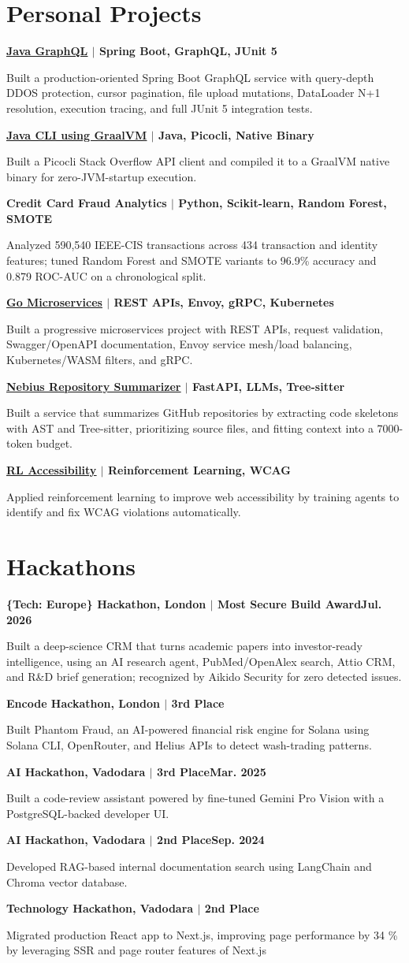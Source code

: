 \documentclass[a4paper,10pt]{article}
\newcommand{\projectLink}[2]{\href{#1}{\underline{#2}}}
\newcommand{\compactEntry}[3]{%
  \textbf{#1}\hfill{\small\textbf{#2}}\\[-1pt]
  {\small #3\par}\vspace{2pt}
}
\begin{document}
\section{Personal Projects}
\compactEntry{\projectLink{https://github.com/aymanapatel/graphql-app}{Java GraphQL} $|$ Spring Boot, GraphQL, JUnit 5}{}{Built a production-oriented Spring Boot GraphQL service with query-depth DDOS protection, cursor pagination, file upload mutations, DataLoader N+1 resolution, execution tracing, and full JUnit 5 integration tests.}
\compactEntry{\projectLink{https://github.com/aymanapatel/java-cli}{Java CLI using GraalVM} $|$ Java, Picocli, Native Binary}{}{Built a Picocli Stack Overflow API client and compiled it to a GraalVM native binary for zero-JVM-startup execution.}
\compactEntry{Credit Card Fraud Analytics $|$ Python, Scikit-learn, Random Forest, SMOTE}{}{Analyzed 590,540 IEEE-CIS transactions across 434 transaction and identity features; tuned Random Forest and SMOTE variants to 96.9\% accuracy and 0.879 ROC-AUC on a chronological split.}
\compactEntry{\projectLink{https://github.com/aymanapatel/golang-microservices}{Go Microservices} $|$ REST APIs, Envoy, gRPC, Kubernetes}{}{Built a progressive microservices project with REST APIs, request validation, Swagger/OpenAPI documentation, Envoy service mesh/load balancing, Kubernetes/WASM filters, and gRPC.}
\compactEntry{\projectLink{https://github.com/aymanapatel/nebius-project}{Nebius Repository Summarizer} $|$ FastAPI, LLMs, Tree-sitter}{}{Built a service that summarizes GitHub repositories by extracting code skeletons with AST and Tree-sitter, prioritizing source files, and fitting context into a 7000-token budget.}
\compactEntry{\projectLink{https://github.com/aymanapatel/rl-a11y}{RL Accessibility} $|$ Reinforcement Learning, WCAG}{}{Applied reinforcement learning to improve web accessibility by training agents to identify and fix WCAG violations automatically.}

\section{Hackathons}
\compactEntry{\{Tech: Europe\} Hackathon, London $|$ Most Secure Build Award}{Jul. 2026}{Built a deep-science CRM that turns academic papers into investor-ready intelligence, using an AI research agent, PubMed/OpenAlex search, Attio CRM, and R\&D brief generation; recognized by Aikido Security for zero detected issues.}
\compactEntry{Encode Hackathon, London $|$ 3rd Place}{}{Built Phantom Fraud, an AI-powered financial risk engine for Solana using Solana CLI, OpenRouter, and Helius APIs to detect wash-trading patterns.}
\compactEntry{AI Hackathon, Vadodara $|$ 3rd Place}{Mar. 2025}{Built a code-review assistant powered by fine-tuned Gemini Pro Vision with a PostgreSQL-backed developer UI.}
\compactEntry{AI Hackathon, Vadodara $|$ 2nd Place}{Sep. 2024}{Developed RAG-based internal documentation search using LangChain and Chroma vector database.}
\compactEntry{Technology Hackathon, Vadodara $|$ 2nd Place}{}{Migrated production React app to Next.js, improving page performance by 34 \% by leveraging SSR and page router features of Next.js}
\end{document}
